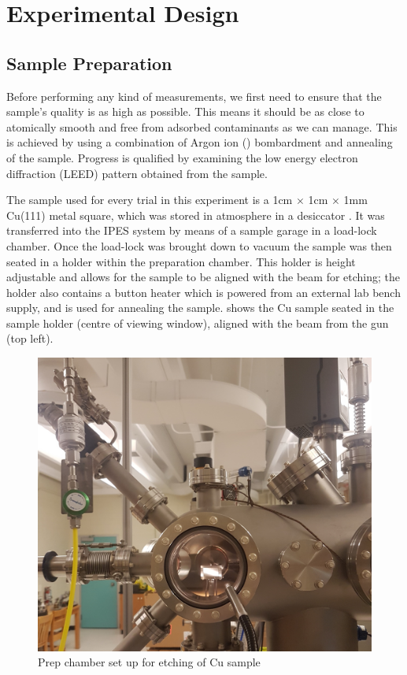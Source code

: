 \section{Experimental Design}

\subsection{Sample Preparation}
Before performing any kind of measurements, we first need to ensure that the sample's quality is as high as possible. This means it should be as close to atomically smooth and free 
from adsorbed contaminants as we can manage. This is achieved by using a combination of Argon ion () bombardment and annealing of the sample. Progress is qualified by examining 
the low energy electron diffraction (LEED) pattern obtained from the sample. 

The sample used for every trial in this experiment is a 1cm $\times$ 1cm $\times$ 1mm Cu(111) metal square, which was stored in atmosphere in a desiccator . It was transferred into the IPES system 
by means of a sample garage in a load-lock chamber. Once the load-lock was brought down to vacuum the sample was then seated in a holder within the preparation chamber. This holder
is height adjustable and allows for the sample to be aligned with the  beam for etching; the holder also contains a button heater which is powered from an external lab bench 
supply, and is used for annealing the sample.  shows the Cu sample seated in the sample holder (centre of viewing window), aligned with the beam from the 
gun (top left). 

\begin{figure}[h!]
    \centering
    \includegraphics[scale=0.08]{Figs/prep.jpg}
    \caption{Prep chamber set up for  etching of Cu sample}
    \label{fig:prepchamber}
\end{figure}

